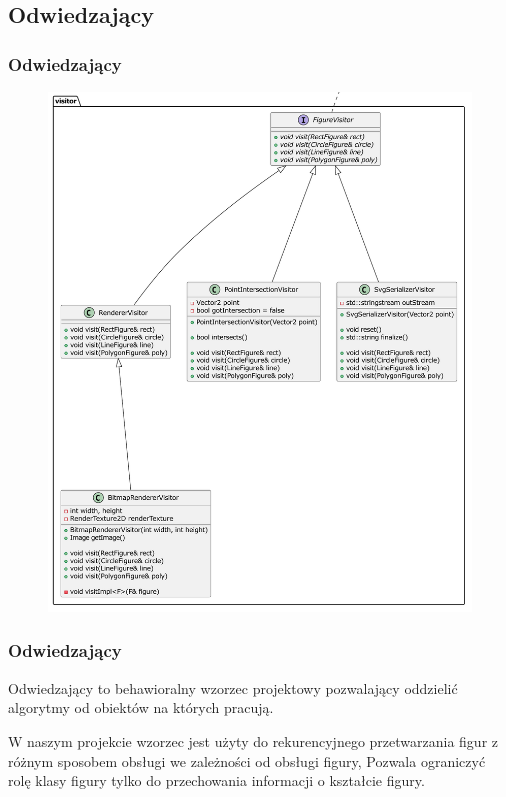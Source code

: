 \documentclass[
	11pt,]{beamer}
\begin{document}
\subsection{Odwiedzający}

\begin{frame}
	\frametitle{Odwiedzający}
	
	\begin{figure}
		\includegraphics[height=0.7\textheight]{figures/visitor.pdf}
	\end{figure}
\end{frame}

\begin{frame}
	\frametitle{Odwiedzający}
	Odwiedzający to behawioralny wzorzec projektowy pozwalający oddzielić algorytmy od obiektów na których pracują.
	
	\vfill
	
	W naszym projekcie wzorzec jest użyty do rekurencyjnego przetwarzania figur z różnym sposobem obsługi we zależności od obsługi figury, Pozwala ograniczyć rolę klasy figury tylko do przechowania informacji o kształcie figury.
	
\end{frame}
\end{document}
